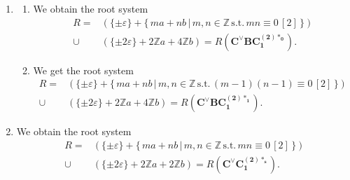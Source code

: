 \documentclass[11pt]{amsart}
\newcommand{\Z}{\mathbb{Z}}
\newcommand{\vep}{\varepsilon}
\begin{document}
\begin{enumerate}
\begin{enumerate}
\begin{align*}
\cup 
&(\{ \pm 2\vep \}+4\Z a+2\Z b) = R(\mathbf{C^\vee C_1^{(4)\ast_0}}).
\end{align*}
\item[(II)] We get the root system 
\begin{align*}
R=
&(\{ \pm\vep \}+\{\, ma+nb\, \vert\, m,n \in \Z\, \text{s.t.}\, (m-1)(n-1) \equiv 0\, [2]\, \})\\
\cup 
&(\{ \pm 2\vep \}+4\Z a+2\Z b) = R(\mathbf{C^\vee C_1^{(4)\ast_1}}).
\end{align*}
\end{enumerate}
\item 
\begin{enumerate}
\item[(I)] We obtain the root system 
\begin{align*}
R=
&(\{ \pm\vep \}+\{\, ma+nb\, \vert\, m,n \in \Z\, \text{s.t.}\, mn \equiv 0\, [2]\, \})\\
\cup 
&(\{ \pm 2\vep \}+2 \Z a+4\Z b) = R(\mathbf{C^\vee BC_1^{(2)\ast_0}}).
\end{align*}
\item[(II)] We get the root system 
\begin{align*}
R=
&(\{ \pm\vep \}+\{\, ma+nb\, \vert\, m,n \in \Z\, \text{s.t.}\, (m-1)(n-1) \equiv 0\, [2]\, \})\\
\cup 
&(\{ \pm 2\vep \}+2\Z a+4\Z b) = R(\mathbf{C^\vee BC_1^{(2)\ast_1}}).
\end{align*}
\end{enumerate}
\item We obtain the root system 
\begin{align*}
R=
&(\{ \pm\vep \}+\{\, ma+nb\, \vert\, m,n \in \Z\, \text{s.t.}\, mn \equiv 0\, [2]\, \}) \\
\cup 
&(\{ \pm 2\vep \}+2\Z a+2\Z b) = R(\mathbf{C^\vee C_1^{(2)\ast_s}}).
\end{align*}
\end{enumerate}

\end{document}
